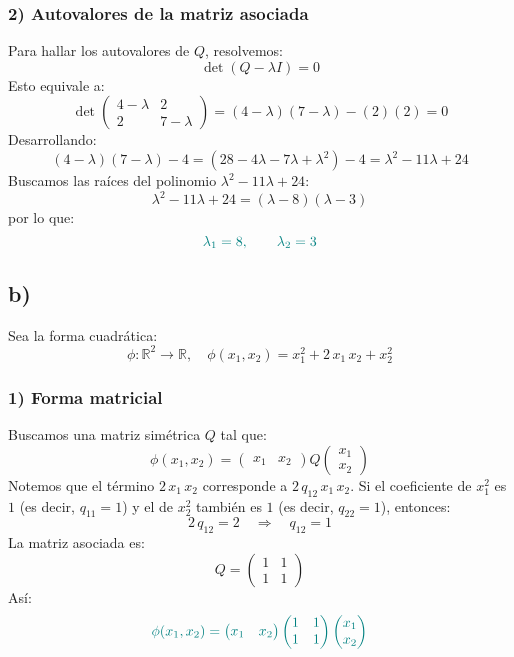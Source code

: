 \documentclass{article}
\begin{document}
\subsubsection*{2) Autovalores de la matriz asociada}

Para hallar los autovalores de \(Q\), resolvemos:
\[
\det(Q - \lambda I) = 0
\]
Esto equivale a:
\[
\det\begin{pmatrix}
4-\lambda & 2\\
2 & 7-\lambda
\end{pmatrix}
= (4-\lambda)(7-\lambda) - (2)(2) = 0
\]
Desarrollando:
\[
(4-\lambda)(7-\lambda) - 4 = (28 - 4\lambda - 7\lambda + \lambda^2) - 4 = \lambda^2 - 11\lambda + 24
\]
Buscamos las raíces del polinomio \(\lambda^2 - 11\lambda + 24\):
\[
\lambda^2 - 11\lambda + 24 = (\lambda - 8)(\lambda - 3)
\]
por lo que:
\[
\color{teal}
\lambda_1 = 8,
\qquad
\lambda_2 = 3
\]

\subsection*{b)}

Sea la forma cuadrática:
\[
\phi:\mathbb{R}^2 \to \mathbb{R},
\quad
\phi(x_1,x_2) = x_1^2 + 2\,x_1\,x_2 + x_2^2
\]

\subsubsection*{1) Forma matricial}

Buscamos una matriz simétrica \(Q\) tal que:
\[
\phi(x_1,x_2) =
\begin{pmatrix}
x_1 & x_2
\end{pmatrix}
Q
\begin{pmatrix}
x_1\\
x_2
\end{pmatrix}
\]
Notemos que el término \(2\,x_1\,x_2\) corresponde a \(2\,q_{12}\,x_1\,x_2\).  
Si el coeficiente de \(x_1^2\) es \(1\) (es decir, \(q_{11} = 1\)) y el de \(x_2^2\) también es \(1\) (es decir, \(q_{22} = 1\)), entonces:
\[
2\,q_{12} = 2
\quad\Longrightarrow\quad
q_{12} = 1
\]
La matriz asociada es:
\[
Q =
\begin{pmatrix}
1 & 1\\
1 & 1
\end{pmatrix}
\]
Así:
\[
\color{teal}
\phi(x_1,x_2) =
\begin{pmatrix}
x_1 & x_2
\end{pmatrix}
\begin{pmatrix}
1 & 1\\
1 & 1
\end{pmatrix}
\begin{pmatrix}
x_1\\
x_2
\end{pmatrix}
\]
\end{document}
